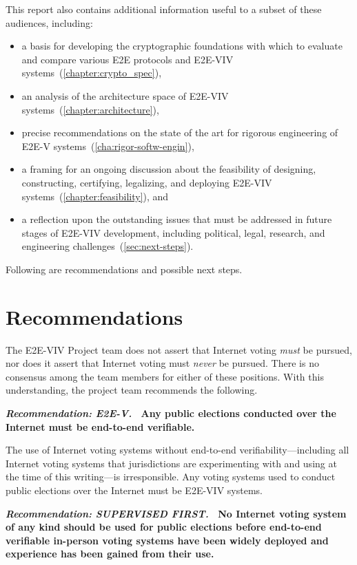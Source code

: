 This report also contains additional information useful to a subset of
these audiences, including:
\begin{itemize}
\item a basis for developing the cryptographic foundations with which
  to evaluate and compare various E2E protocols and E2E-VIV
  systems~(\autoref{chapter:crypto_spec}),
\item an analysis of the architecture space of E2E-VIV
  systems~(\autoref{chapter:architecture}),
\item precise recommendations on the state of the art for rigorous
  engineering of E2E-V systems~(\autoref{cha:rigor-softw-engin}),
\item a framing for an ongoing discussion about the feasibility of
  designing, constructing, certifying, legalizing, and deploying
  E2E-VIV systems~(\autoref{chapter:feasibility}), and
\item a reflection upon the outstanding issues that must be addressed
  in future stages of E2E-VIV development, including political, legal,
  research, and engineering challenges~(\autoref{sec:next-steps}).
\end{itemize}

Following are recommendations and possible next steps.

\section{Recommendations}

The E2E-VIV Project team does not assert that Internet voting
\emph{must} be pursued, nor does it assert that Internet voting must
\emph{never} be pursued. There is no consensus among the team members
for either of these positions. With this understanding, the project
team recommends the following.

\vspace{12pt} \textbf{\emph{Recommendation: E2E-V.} \ Any public
  elections conducted over the Internet must be end-to-end
  verifiable.}

The use of Internet voting systems without end-to-end
verifiability---including all Internet voting systems that
jurisdictions are experimenting with and using at the time of this
writing---is irresponsible. Any voting systems used to conduct public
elections over the Internet must be E2E-VIV systems.

\vspace{12pt} \textbf{\emph{Recommendation: SUPERVISED FIRST.} \ No
  Internet voting system of any kind should be used for public
  elections before end-to-end verifiable in-person voting systems have
  been widely deployed and experience has been gained from their use.}

